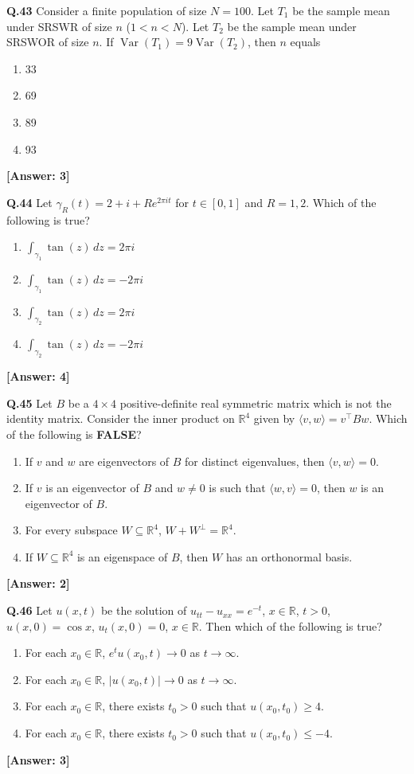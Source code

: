 \documentclass[12pt,a4paper]{article}
\newcommand{\ans}[1]{\quad\textcolor{anscolor}{\textbf{[Answer: #1]}}}
\begin{document}
\textbf{Q.43} Consider a finite population of size $N=100$. Let $T_1$ be the sample mean under SRSWR of size $n$ ($1<n<N$). Let $T_2$ be the sample mean under SRSWOR of size $n$. If $\operatorname{Var}(T_1)=9\operatorname{Var}(T_2)$, then $n$ equals
\begin{enumerate}[label=\arabic*.]
\item 33 \item 69 \item 89 \item 93
\end{enumerate}\ans{3}

\textbf{Q.44} Let $\gamma_R(t)=2+i+Re^{2\pi it}$ for $t\in[0,1]$ and $R=1,2$. Which of the following is true?
\begin{enumerate}[label=\arabic*.]
\item $\displaystyle\int_{\gamma_1}\tan(z)\,dz=2\pi i$ \item $\displaystyle\int_{\gamma_1}\tan(z)\,dz=-2\pi i$
\item $\displaystyle\int_{\gamma_2}\tan(z)\,dz=2\pi i$ \item $\displaystyle\int_{\gamma_2}\tan(z)\,dz=-2\pi i$
\end{enumerate}\ans{4}

\textbf{Q.45} Let $B$ be a $4\times4$ positive-definite real symmetric matrix which is not the identity matrix. Consider the inner product on $\mathbb{R}^4$ given by $\langle v,w\rangle=v^\top Bw$. Which of the following is \textbf{FALSE}?
\begin{enumerate}[label=\arabic*.]
\item If $v$ and $w$ are eigenvectors of $B$ for distinct eigenvalues, then $\langle v,w\rangle=0$.
\item If $v$ is an eigenvector of $B$ and $w\neq0$ is such that $\langle w,v\rangle=0$, then $w$ is an eigenvector of $B$.
\item For every subspace $W\subseteq\mathbb{R}^4$, $W+W^\perp=\mathbb{R}^4$.
\item If $W\subseteq\mathbb{R}^4$ is an eigenspace of $B$, then $W$ has an orthonormal basis.
\end{enumerate}\ans{2}

\textbf{Q.46} Let $u(x,t)$ be the solution of $u_{tt}-u_{xx}=e^{-t}$, $x\in\mathbb{R}$, $t>0$, $u(x,0)=\cos x$, $u_t(x,0)=0$, $x\in\mathbb{R}$. Then which of the following is true?
\begin{enumerate}[label=\arabic*.]
\item For each $x_0\in\mathbb{R}$, $e^tu(x_0,t)\to0$ as $t\to\infty$.
\item For each $x_0\in\mathbb{R}$, $|u(x_0,t)|\to0$ as $t\to\infty$.
\item For each $x_0\in\mathbb{R}$, there exists $t_0>0$ such that $u(x_0,t_0)\ge4$.
\item For each $x_0\in\mathbb{R}$, there exists $t_0>0$ such that $u(x_0,t_0)\le-4$.
\end{enumerate}\ans{3}
\end{document}
